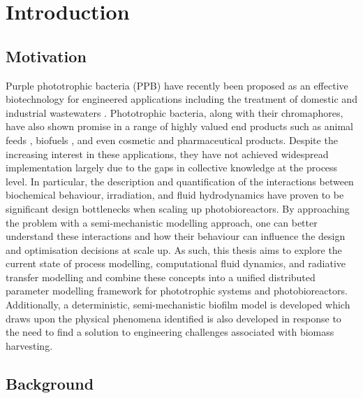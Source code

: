\chapter[Introduction]{Introduction}
\label{chap:chap1}
\section{Motivation}
\label{sec:chap1-motivation}
Purple phototrophic bacteria (PPB) have recently been proposed as an effective biotechnology for engineered applications including the treatment of domestic \cite{hulsen2016} and industrial wastewaters \cite{hulsen2018}. Phototrophic bacteria, along with their chromaphores, have also shown promise in a range of highly valued end products such as animal feeds \cite{sun2016}, biofuels \cite{adessi2014}, and even cosmetic and pharmaceutical products\cite{liu2013, Wang2018}. Despite the increasing interest in these applications, they have not achieved widespread implementation largely due to the gaps in collective knowledge at the process level. In particular, the description and quantification of the interactions between biochemical behaviour, irradiation, and fluid hydrodynamics have proven to be significant design bottlenecks when scaling up photobioreactors. 
\skippingparagraph
\noindent By approaching the problem with a semi-mechanistic modelling approach, one can better understand these interactions and how their behaviour can influence the design and optimisation decisions at scale up. As such, this thesis aims to explore the current state of process modelling, computational fluid dynamics, and radiative transfer modelling and combine these concepts into a unified distributed parameter modelling framework for phototrophic systems and photobioreactors.  Additionally, a deterministic, semi-mechanistic biofilm model is developed which draws upon the physical phenomena identified is also developed in response to the need to find a solution to engineering challenges associated with biomass harvesting. 





\newpage
\section{Background}
\label{sec:chap1-background}
